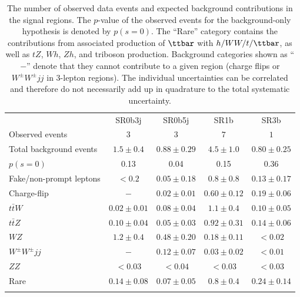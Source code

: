 \begin{table}[htb!]
\begin{center}
\setlength{\tabcolsep}{0.0pc}
\caption{The number of observed data events and expected background contributions in the signal regions. 
The $p$-value of the observed events for the background-only hypothesis is denoted by $p(s = 0)$. 
The ``Rare'' category contains the contributions from associated production of $\ttbar$ with $h/WW/t/\ttbar$, 
as well as $tZ$, $Wh$, $Zh$, and triboson production. 
Background categories shown as ``$-$'' denote that they cannot contribute to a given region (charge flips or $W^\pm W^\pm jj$ in 3-lepton regions). 
The individual uncertainties can be correlated and therefore do not necessarily add up in quadrature to the total systematic uncertainty. 
}
\label{tab:SR_yields}
{\small
\begin{tabular*}{\textwidth}{@{\extracolsep{\fill}}lcccc}
\noalign{\smallskip}\hline\hline\noalign{\smallskip}
         & SR0b3j         & SR0b5j     & SR1b & SR3b     \\[-0.05cm]
\noalign{\smallskip}\hline\hline\noalign{\smallskip}
Observed events         & $3$     &  $3$  & $7$  & $1$            \\
\noalign{\smallskip}\hline\noalign{\smallskip}
Total background events & $1.5 \pm 0.4$ & $0.88 \pm 0.29$ & $4.5 \pm 1.0$ & $0.80 \pm 0.25$\\
$p(s = 0)$                &  0.13  &  0.04  &  0.15  &   0.36   \\
\noalign{\smallskip}\hline\noalign{\smallskip}
Fake/non-prompt leptons & $<0.2$ & $0.05\pm 0.18$ & $0.8 \pm 0.8$ & $0.13 \pm 0.17$\\
Charge-flip & $-$ & $0.02 \pm 0.01$ & $0.60 \pm 0.12$ & $0.19 \pm 0.06$\\
$t\bar{t}W$ & $0.02 \pm 0.01$ & $0.08 \pm 0.04$ & $1.1 \pm 0.4$ & $0.10 \pm 0.05$\\
$t\bar{t}Z$ & $0.10 \pm 0.04$ & $0.05 \pm 0.03$ & $0.92 \pm 0.31$ & $0.14 \pm 0.06$\\
$WZ$ & $1.2 \pm 0.4$ & $0.48 \pm 0.20$ & $0.18 \pm 0.11$ & $<0.02$\\
$W^\pm W^\pm jj$ & $-$ & $0.12 \pm 0.07$ & $0.03 \pm 0.02$ & $<0.01$\\
$ZZ$ & $<0.03$ & $<0.04$ & $<0.03$ & $<0.03$\\
Rare & $0.14 \pm 0.08$ & $0.07 \pm 0.05$ & $0.8 \pm 0.4$ & $0.24 \pm 0.14$\\  
\noalign{\smallskip}\hline\hline\noalign{\smallskip}
\end{tabular*}
}
\end{center}
\end{table}

